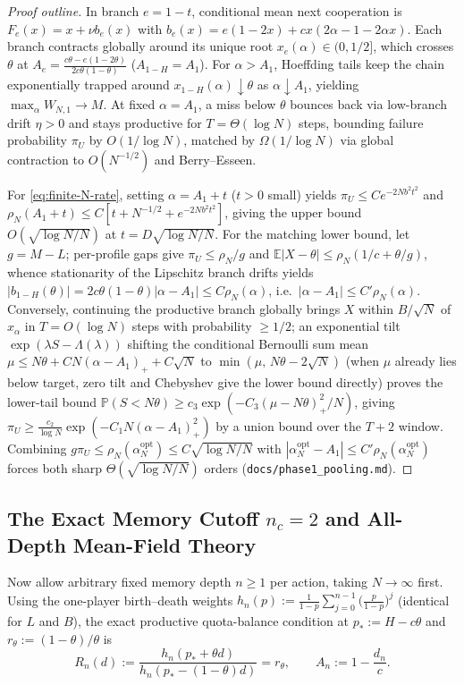 \documentclass[11pt,reqno]{amsart}
\theoremstyle{definition}
\theoremstyle{remark}
\newcommand{\E}{\mathbb{E}}
\newcommand{\Prob}{\mathbb{P}}
\begin{document}
\begin{proof}[Proof outline]
In branch $e = 1-t$, conditional mean next cooperation is $F_e(x) = x + \nu b_e(x)$ with $b_e(x) = e(1-2x) + c x(2\alpha - 1 - 2\alpha x)$. Each branch contracts globally around its unique root $x_e(\alpha) \in (0, 1/2]$, which crosses $\theta$ at $A_e = \frac{c\theta - e(1-2\theta)}{2c\theta(1-\theta)}$ ($A_{1-H} = A_1$). For $\alpha > A_1$, Hoeffding tails keep the chain exponentially trapped around $x_{1-H}(\alpha) \downarrow \theta$ as $\alpha \downarrow A_1$, yielding $\max_\alpha W_{N,1} \to M$. At fixed $\alpha = A_1$, a miss below $\theta$ bounces back via low-branch drift $\eta > 0$ and stays productive for $T = \Theta(\log N)$ steps, bounding failure probability $\pi_U$ by $O(1/\log N)$, matched by $\Omega(1/\log N)$ via global contraction to $O(N^{-1/2})$ and Berry--Esseen.

For \eqref{eq:finite-N-rate}, setting $\alpha = A_1 + t$ ($t > 0$ small) yields $\pi_U \le C e^{-2Nb^2 t^2}$ and $\rho_N(A_1+t) \le C[t + N^{-1/2} + e^{-2Nb^2 t^2}]$, giving the upper bound $O(\sqrt{\log N/N})$ at $t = D\sqrt{\log N/N}$. For the matching lower bound, let $g = M-L$; per-profile gaps give $\pi_U \le \rho_N/g$ and $\E|X-\theta| \le \rho_N(1/c + \theta/g)$, whence stationarity of the Lipschitz branch drifts yields $|b_{1-H}(\theta)| = 2c\theta(1-\theta)|\alpha - A_1| \le C\rho_N(\alpha)$, i.e.\ $|\alpha - A_1| \le C'\rho_N(\alpha)$. Conversely, continuing the productive branch globally brings $X$ within $B/\sqrt{N}$ of $x_\alpha$ in $T = O(\log N)$ steps with probability $\ge 1/2$; an exponential tilt $\exp(\lambda S - \Lambda(\lambda))$ shifting the conditional Bernoulli sum mean $\mu \le N\theta + CN(\alpha-A_1)_+ + C\sqrt{N}$ to $\min(\mu,\, N\theta - 2\sqrt{N})$ (when $\mu$ already lies below target, zero tilt and Chebyshev give the lower bound directly) proves the lower-tail bound $\Prob(S < N\theta) \ge c_3 \exp(-C_3 (\mu - N\theta)_+^2/N)$, giving $\pi_U \ge \frac{c_2}{\log N}\exp(-C_1 N(\alpha-A_1)_+^2)$ by a union bound over the $T+2$ window. Combining $g\pi_U \le \rho_N(\alpha_N^{\mathrm{opt}}) \le C\sqrt{\log N/N}$ with $|\alpha_N^{\mathrm{opt}} - A_1| \le C'\rho_N(\alpha_N^{\mathrm{opt}})$ forces both sharp $\Theta(\sqrt{\log N/N})$ orders (\texttt{docs/phase1\_pooling.md}).
\end{proof}

\subsection{The Exact Memory Cutoff \texorpdfstring{$n_c = 2$}{n\_c = 2} and All-Depth Mean-Field Theory}
Now allow arbitrary fixed memory depth $n \ge 1$ per action, taking $N \to \infty$ first. Using the one-player birth--death weights $h_n(p) := \frac{1}{1-p}\sum_{j=0}^{n-1}\bigl(\frac{p}{1-p}\bigr)^j$ (identical for $L$ and $B$), the exact productive quota-balance condition at $p_* := H - c\theta$ and $r_\theta := (1-\theta)/\theta$ is
\begin{equation}\label{eq:quota-eq}
  R_n(d) := \frac{h_n(p_* + \theta d)}{h_n(p_* - (1-\theta)d)} = r_\theta, \qquad
  A_n := 1 - \frac{d_n}{c}.
\end{equation}
\end{document}
